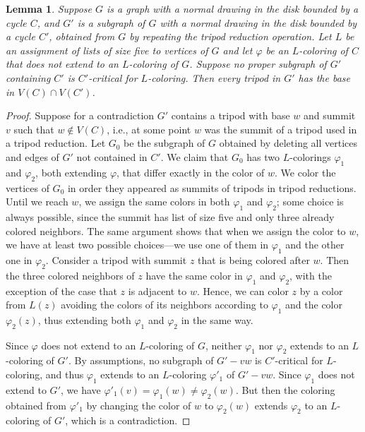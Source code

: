 \documentclass[12pt,twoside,openright,a4paper]{book}
\newtheorem{lemma}[theorem]{Lemma}
\begin{document}
\begin{lemma}\label{lemma:tripstop}
Suppose $G$ is a graph with a normal drawing in the disk bounded by a cycle $C$,
and $G'$ is a subgraph of $G$ with a normal drawing in the disk bounded by a cycle $C'$, obtained
from $G$ by repeating the tripod reduction operation.  Let $L$ be an assignment of lists of size five to vertices of $G$
and let $\varphi$ be an $L$-coloring of $C$ that does not extend to an $L$-coloring of $G$.   Suppose no proper subgraph
of $G'$ containing $C'$ is $C'$-critical for $L$-coloring.  Then every tripod in $G'$ has the base in $V(C)\cap V(C')$.
\end{lemma}
\begin{proof}
Suppose for a contradiction $G'$ contains a tripod with base $w$ and summit $v$ such that $w\not\in V(C)$,
i.e., at some point $w$ was the summit of a tripod used in a tripod reduction.
Let $G_0$ be the subgraph of $G$ obtained by deleting all vertices and edges of $G'$ not contained in $C'$.
We claim that $G_0$ has two $L$-colorings $\varphi_1$ and $\varphi_2$, both extending $\varphi$,
that differ exactly in the color of $w$.  We color the vertices of $G_0$
in order they appeared as summits of tripods in tripod reductions.  Until we reach $w$, we assign the same
colors in both $\varphi_1$ and $\varphi_2$; some choice is always possible, since the summit has list of size five
and only three already colored neighbors.  The same argument shows that when we assign the color to $w$,
we have at least two possible choices---we use one of them in $\varphi_1$ and the other one in $\varphi_2$.
Consider a tripod with summit $z$ that is being colored after $w$.  Then the three colored neighbors of $z$ have the
same color in $\varphi_1$ and $\varphi_2$, with the exception of the case that $z$ is adjacent to $w$.
Hence, we can color $z$ by a color from $L(z)$ avoiding the colors of its neighbors according to $\varphi_1$
and the color $\varphi_2(z)$, thus extending both $\varphi_1$ and $\varphi_2$ in the same way.

Since $\varphi$ does not extend to an $L$-coloring of $G$, neither $\varphi_1$ nor $\varphi_2$ extends to an $L$-coloring of
$G'$.  By assumptions, no subgraph of $G'-vw$ is $C'$-critical for $L$-coloring, and thus $\varphi_1$ extends
to an $L$-coloring $\varphi'_1$ of $G'-vw$.  Since $\varphi_1$ does not extend to $G'$, we have
$\varphi'_1(v)=\varphi_1(w)\neq\varphi_2(w)$.  But then the coloring obtained from $\varphi'_1$ by changing
the color of $w$ to $\varphi_2(w)$ extends $\varphi_2$ to an $L$-coloring of $G'$, which is a contradiction.
\end{proof}
\end{document}
